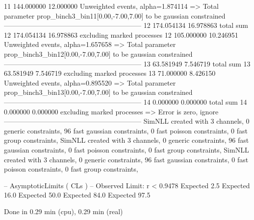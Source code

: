 11         144.000000      12.000000       Unweighted events, alpha=1.874114
  => Total parameter prop_binch3_bin11[0.00,-7.00,7.00] to be gaussian constrained
------------------------------------------------------------
12         174.054134      16.978863       total sum                     
12         174.054134      16.978863       excluding marked processes    
12         105.000000      10.246951       Unweighted events, alpha=1.657658
  => Total parameter prop_binch3_bin12[0.00,-7.00,7.00] to be gaussian constrained
------------------------------------------------------------
13         63.581949       7.546719        total sum                     
13         63.581949       7.546719        excluding marked processes    
13         71.000000       8.426150        Unweighted events, alpha=0.895520
  => Total parameter prop_binch3_bin13[0.00,-7.00,7.00] to be gaussian constrained
------------------------------------------------------------
14         0.000000        0.000000        total sum                     
14         0.000000        0.000000        excluding marked processes    
  => Error is zero, ignore      
------------------------------------------------------------
SimNLL created with 3 channels, 0 generic constraints, 96 fast gaussian constraints, 0 fast poisson constraints, 0 fast group constraints, 
SimNLL created with 3 channels, 0 generic constraints, 96 fast gaussian constraints, 0 fast poisson constraints, 0 fast group constraints, 
SimNLL created with 3 channels, 0 generic constraints, 96 fast gaussian constraints, 0 fast poisson constraints, 0 fast group constraints, 

 -- AsymptoticLimits ( CLs ) --
Observed Limit: r < 0.9478
Expected  2.5%
Expected 16.0%
Expected 50.0%
Expected 84.0%
Expected 97.5%

Done in 0.29 min (cpu), 0.29 min (real)
